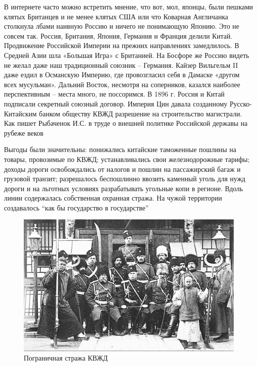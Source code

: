 В интернете часто можно встретить мнение, что вот, мол, японцы, были пешками клятых Британцев и не менее клятых США или что Коварная Англичанка столкнула лбами наивную Россию и ничего не понимающую Японию. Это не совсем так.
Россия, Британия, Япония, Германия и Франция делили Китай. Продвижение Российской Империи на прежних направлениях замедлилось. В Средней Азии шла «Большая Игра» с Британией. На Босфоре же Россию видеть не желал даже наш традиционный союзник – Германия. Кайзер Вильгельм II даже ездил в Османскую Империю, где провозгласил себя в Дамаске «другом всех мусульман». Дальний Восток, несмотря на соперников, казался наиболее перспективным – места много, не поссоримся.
В 1896 г. Россия и Китай подписали секретный союзный договор. Империя Цин давала созданному Русско-Китайским банком обществу КВЖД разрешение на строительство магистрали. Как пишет Рыбаченок И.С. в труде о внешней политике Российской державы на рубеже веков

\begin{textcitation}
	Выгоды были значительны: понижались китайские таможенные пошлины на товары, провозимые по КВЖД; устанавливались свои железнодорожные тарифы; доходы дороги освобождались от налогов и пошлин на пассажирский багаж и грузовой транзит; разрешалось беспошлинно ввозить каменный уголь для нужд дороги и на льготных условиях разрабатывать угольные копи в регионе. Вдоль линии содержалась собственная охранная стража. На чужой территории создавалось “как бы государство в государстве”
\end{textcitation}

\begin{figure}[h!tb] 
	\centering\includegraphics[scale=0.2]{Data/RYAV_predposylki/1snYqdEvc-k.jpg}
	\caption{Пограничная стража КВЖД
	}%
\end{figure}

